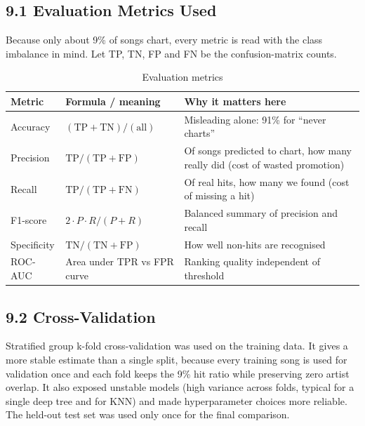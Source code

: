 \documentclass[11pt,a4paper]{article}
\begin{document}
\subsection*{9.1 Evaluation Metrics Used}
Because only about 9\% of songs chart, every metric is read with the class imbalance in mind. Let TP, TN, FP and FN be the confusion-matrix counts.

\begin{table}[H]
\centering
\caption{Evaluation metrics}
\begin{tabular}{llp{7.5cm}}
\toprule
\textbf{Metric} & \textbf{Formula / meaning} & \textbf{Why it matters here} \\
\midrule
Accuracy & $(\text{TP}+\text{TN})/(\text{all})$ & Misleading alone: 91\% for ``never charts'' \\
Precision & $\text{TP}/(\text{TP}+\text{FP})$ & Of songs predicted to chart, how many really did (cost of wasted promotion) \\
Recall & $\text{TP}/(\text{TP}+\text{FN})$ & Of real hits, how many we found (cost of missing a hit) \\
F1-score & $2 \cdot P \cdot R / (P+R)$ & Balanced summary of precision and recall \\
Specificity & $\text{TN}/(\text{TN}+\text{FP})$ & How well non-hits are recognised \\
ROC-AUC & Area under TPR vs FPR curve & Ranking quality independent of threshold \\
\bottomrule
\end{tabular}
\end{table}

\subsection*{9.2 Cross-Validation}
Stratified group k-fold cross-validation was used on the training data. It gives a more stable estimate than a single split, because every training song is used for validation once and each fold keeps the 9\% hit ratio while preserving zero artist overlap. It also exposed unstable models (high variance across folds, typical for a single deep tree and for KNN) and made hyperparameter choices more reliable. The held-out test set was used only once for the final comparison.
\end{document}
